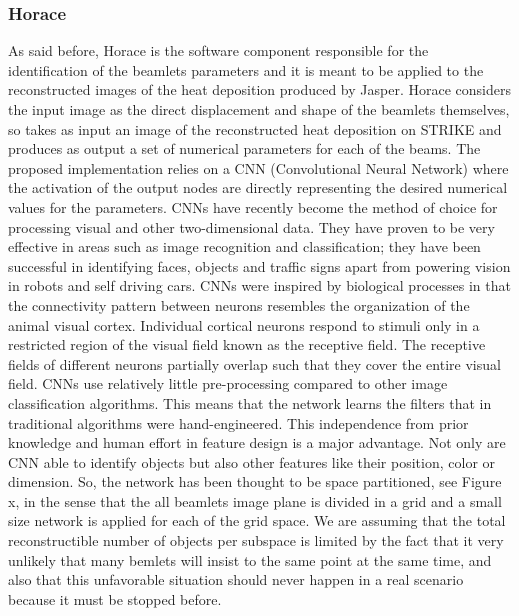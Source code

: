 \subsubsection{Horace}
As said before, Horace is the software component responsible for the identification of the beamlets parameters and it is meant to be applied to the reconstructed images of the heat deposition produced by Jasper. Horace considers the input image as the direct displacement and shape of the beamlets themselves, so takes as input an image of the reconstructed heat deposition on STRIKE and produces as output a set of numerical parameters for each of the beams.
The proposed implementation relies on a CNN (Convolutional Neural Network) where the activation of the output nodes are directly representing the desired numerical values for the parameters. 
CNNs have recently become the method of choice for processing visual and other two-dimensional data. They have proven to be very effective in areas such as image recognition and classification; they have been successful in identifying faces, objects and traffic signs apart from powering vision in robots and self driving cars.
CNNs were inspired by biological processes in that the connectivity pattern between neurons resembles the organization of the animal visual cortex. Individual cortical neurons respond to stimuli only in a restricted region of the visual field known as the receptive field. The receptive fields of different neurons partially overlap such that they cover the entire visual field.
CNNs use relatively little pre-processing compared to other image classification algorithms. This means that the network learns the filters that in traditional algorithms were hand-engineered. This independence from prior knowledge and human effort in feature design is a major advantage. 
Not only are CNN able to identify objects but also other features like their position, color or dimension. 
So, the network has been thought to be space partitioned, see Figure x, in the sense that the all beamlets image plane is divided in a grid and a small size network is applied for each of the grid space. We are assuming that the total reconstructible number of objects per subspace is limited by the fact that it very unlikely that many bemlets will insist to the same point at the same time, and also that this unfavorable situation should never happen in a real scenario because it must be stopped before. 
